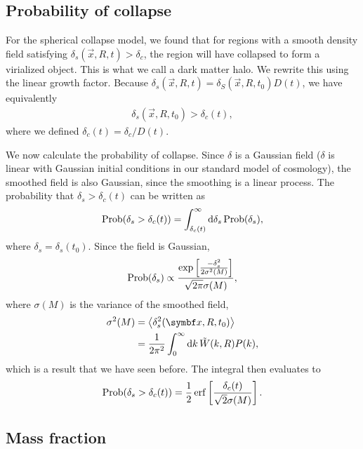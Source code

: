 \subsection{Probability of collapse}


For the spherical collapse model, we found that for regions with a smooth density field satisfying $\delta_s(\vec{x}, R, t) > \delta_c$,
the region will have collapsed to form a virialized object.
This is what we call a dark matter halo.
We rewrite this using the linear growth factor.
Because $\delta_s(\vec{x}, R, t) = \delta_S(\vec{x}, R, t_0) D(t)$, we have equivalently
\begin{align*}
	\delta_s(\vec{x}, R, t_0)
	> \delta_c(t),
\end{align*}
where we defined $\delta_c(t) = \delta_c / D(t)$.

We now calculate the probability of collapse.
Since $\delta$ is a Gaussian field
($\delta$ is linear with Gaussian initial conditions in our standard model of cosmology),
the smoothed field is also Gaussian, since the smoothing is a linear process.
The probability that $\delta_s > \delta_c(t)$ can be written as
\begin{align*}
	\operatorname{Prob}(\delta_s > \delta_c(t))
	= \int_{\delta_c(t)}^{\infty}
	\dd{\delta_s}
	\operatorname{Prob}(\delta_s),
\end{align*}
where $\delta_s = \delta_s(t_0)$.
Since the field is Gaussian,
\begin{align*}
	\operatorname{Prob}(\delta_s)
	\propto
	\frac{
		\exp \left[
			\frac{-\delta_s^2}{2 \sigma^2(M)}
		\right]
	}{
		\sqrt{2\pi} \sigma(M)
	},
\end{align*}
where $\sigma(M)$ is the variance of the smoothed field,
\begin{align*}
	\sigma^2(M)
	&= \avg{\delta_s^2(\vec{x}, R, t_0)}\\
	&= \frac{1}{2\pi^2} \int_0^\infty \dd{k} \tilde{W}(k, R) P(k),
\end{align*}
which is a result that we have seen before.
The integral then evaluates to
\begin{align*}
	\Prob(\delta_s > \delta_c(t))
	= \frac{1}{2} \erf
	\left[ \frac{\delta_c(t)}{\sqrt{2} \sigma(M)} \right].
\end{align*}

\subsection{Mass fraction}


